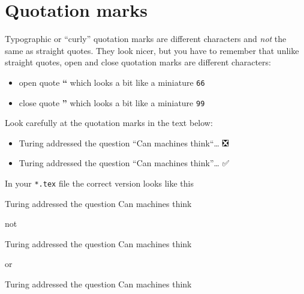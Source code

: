 \documentclass[
]{book}
\newenvironment{Shaded}{\begin{snugshade}}{\end{snugshade}}
\newcommand{\NormalTok}[1]{#1}
\providecommand{\tightlist}{%
  \setlength{\itemsep}{0pt}\setlength{\parskip}{0pt}}
\begin{document}
\section{Quotation marks}\label{quotation-marks}

Typographic or ``curly'' quotation marks are different characters and \emph{not} the same as straight quotes. They look nicer, but you have to remember that unlike straight quotes, open and close quotation marks are different characters:

\begin{itemize}
\tightlist
\item
  open quote \textbf{``} which looks a bit like a miniature \texttt{66}
\item
  close quote \textbf{''} which looks a bit like a miniature \texttt{99}
\end{itemize}

Look carefully at the quotation marks in the text below:

\begin{itemize}
\tightlist
\item
  Turing addressed the question ``Can machines think``\ldots{} ❎
\item
  Turing addressed the question ``Can machines think''\ldots{} ✅
\end{itemize}

In your \texttt{*.tex} file the correct version looks like this

\begin{Shaded}
\begin{Highlighting}[]
\NormalTok{Turing addressed the question \textasciigrave{}\textasciigrave{}Can machines think\textquotesingle{}\textquotesingle{}}
\end{Highlighting}
\end{Shaded}

not

\begin{Shaded}
\begin{Highlighting}[]
\NormalTok{Turing addressed the question \textasciigrave{}\textasciigrave{}Can machines think\textasciigrave{}\textasciigrave{}}
\end{Highlighting}
\end{Shaded}

or

\begin{Shaded}
\begin{Highlighting}[]
\NormalTok{Turing addressed the question \textquotesingle{}\textquotesingle{}Can machines think\textquotesingle{}\textquotesingle{}}
\end{Highlighting}
\end{Shaded}
\end{document}
